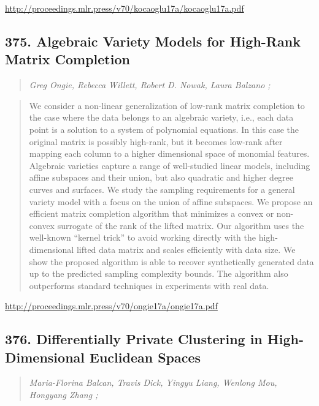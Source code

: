 \documentclass{article}
\begin{document}
\href{http://proceedings.mlr.press/v70/kocaoglu17a/kocaoglu17a.pdf}{http://proceedings.mlr.press/v70/kocaoglu17a/kocaoglu17a.pdf}

\subsection{375. Algebraic Variety Models for High-Rank Matrix Completion}

\begin{quote}
\footnotesize{\textit{Greg Ongie, Rebecca Willett, Robert D. Nowak, Laura Balzano ;}}

\end{quote}

\begin{quote}
    We consider a non-linear generalization of low-rank matrix completion to the case where the data belongs to an algebraic variety, i.e., each data point is a solution to a system of polynomial equations. In this case the original matrix is possibly high-rank, but it becomes low-rank after mapping each column to a higher dimensional space of monomial features. Algebraic varieties capture a range of well-studied linear models, including affine subspaces and their union, but also quadratic and higher degree curves and surfaces. We study the sampling requirements for a general variety model with a focus on the union of affine subspaces. We propose an efficient matrix completion algorithm that minimizes a convex or non-convex surrogate of the rank of the lifted matrix. Our algorithm uses the well-known “kernel trick” to avoid working directly with the high-dimensional lifted data matrix and scales efficiently with data size. We show the proposed algorithm is able to recover synthetically generated data up to the predicted sampling complexity bounds. The algorithm also outperforms standard techniques in experiments with real data.  
\end{quote}

\href{http://proceedings.mlr.press/v70/ongie17a/ongie17a.pdf}{http://proceedings.mlr.press/v70/ongie17a/ongie17a.pdf}

\subsection{376. Differentially Private Clustering in High-Dimensional Euclidean Spaces}

\begin{quote}
\footnotesize{\textit{Maria-Florina Balcan, Travis Dick, Yingyu Liang, Wenlong Mou, Hongyang Zhang ;}}

\end{quote}
\end{document}
